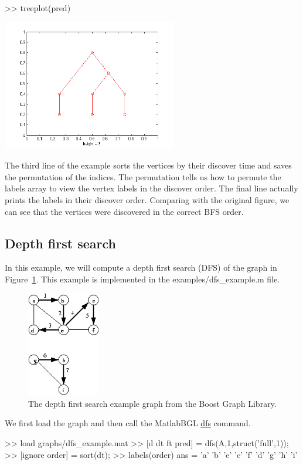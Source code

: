 \documentclass[12pt]{article}
\newcommand{\mycmd}[1]{\url{#1}}
\newcommand{\mypath}[1]{{\ttfamily \small #1}}
\begin{document}
\begin{mcode}
>> treeplot(pred)
\end{mcode}
\begin{center}
\includegraphics[width=3in]{bfs_treeplot}
\end{center}

The third line of the example sorts the vertices by their discover time and saves the permutation of the indices.  The permutation tells us how to permute the labels array to view the vertex labels in the discover order.  The final line actually prints the labels in their discover order.  Comparing with the original figure, we can see that the vertices were discovered in the correct BFS order.

\subsection{Depth first search}

In this example, we will compute a depth first search (DFS) of the graph in Figure~\ref{fig:dfs}.  This example is implemented in the \mypath{examples/dfs\_example.m} file.

\begin{figure}[ht!]
\centering
\includegraphics[width=1.25in]{dfs}
\caption{The depth first search example graph from the Boost Graph Library.}
\label{fig:dfs}
\end{figure}

We first load the graph and then call the MatlabBGL \mycmd{dfs} command.  
\begin{mcode}
>> load graphs/dfs_example.mat
>> [d dt ft pred] = dfs(A,1,struct('full',1));
>> [ignore order] = sort(dt);
>> labels(order)
ans = 
    'a'
    'b'
    'e'
    'c'
    'f'
    'd'
    'g'
    'h'
    'i'
\end{mcode}
\end{document}
